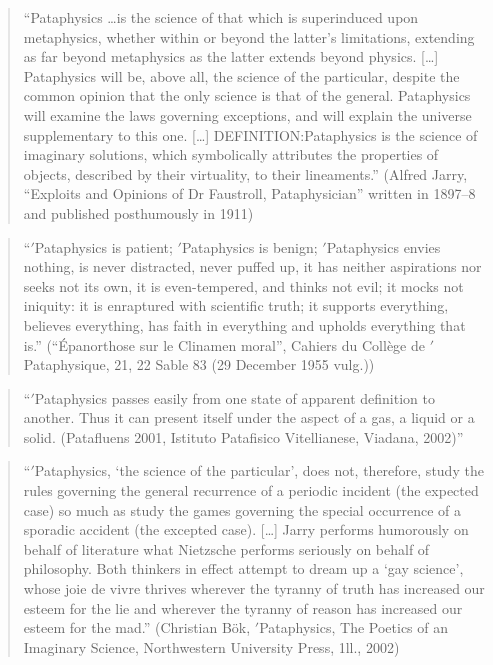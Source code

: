 \begin{quote}
  ``Pataphysics \ldots is the science of that which is superinduced upon metaphysics, whether within or beyond the latter's limitations, extending as far beyond metaphysics as the latter extends beyond physics. [\ldots] Pataphysics will be, above all, the science of the particular, despite the common opinion that the only science is that of the general. Pataphysics will examine the laws governing exceptions, and will explain the universe supplementary to this one. [\ldots] DEFINITION:\@ Pataphysics is the science of imaginary solutions, which symbolically attributes the properties of objects, described by their virtuality, to their lineaments.'' (Alfred Jarry, ``Exploits and Opinions of Dr Faustroll, Pataphysician'' written in 1897--8 and published posthumously in 1911) \autocite{Jarry1996}
\end{quote}

\begin{quote}
  ``$'$Pataphysics is patient; $'$Pataphysics is benign; $'$Pataphysics envies nothing, is never distracted, never puffed up, it has neither aspirations nor seeks not its own, it is even-tempered, and thinks not evil; it mocks not iniquity: it is enraptured with scientific truth; it supports everything, believes everything, has faith in everything and upholds everything that is.'' (``Épanorthose sur le Clinamen moral'', Cahiers du Collège de $'$Pataphysique, 21, 22 Sable 83 (29 December 1955 vulg.)) \autocite{Brotchie2003}
\end{quote}

\begin{quote}
  ``$'$Pataphysics passes easily from one state of apparent definition to another. Thus it can present itself under the aspect of a gas, a liquid or a solid. (Patafluens 2001, Istituto Patafisico Vitellianese, Viadana, 2002)'' \autocite{Brotchie2003}
\end{quote}

\begin{quote}
  ``$'$Pataphysics, `the science of the particular', does not, therefore, study the rules governing the general recurrence of a periodic incident (the expected case) so much as study the games governing the special occurrence of a sporadic accident (the excepted case). […] Jarry performs humorously on behalf of literature what Nietzsche performs seriously on behalf of philosophy. Both thinkers in effect attempt to dream up a `gay science', whose joie de vivre thrives wherever the tyranny of truth has increased our esteem for the lie and wherever the tyranny of reason has increased our esteem for the mad.'' (Christian Bök, $'$Pataphysics, The Poetics of an Imaginary Science, Northwestern University Press, 1ll., 2002) \autocite{Boek2002}
\end{quote}

